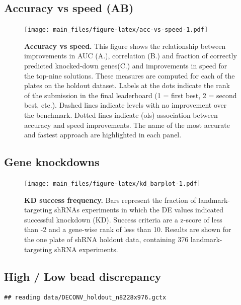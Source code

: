 \documentclass[]{article}
\begin{document}
\hypertarget{accuracy-vs-speed-ab}{%
\subsection{Accuracy vs speed (AB)}\label{accuracy-vs-speed-ab}}

\begin{figure}
\centering
\texttt{[image: main\_files/figure-latex/acc-vs-speed-1.pdf]}
\caption{\label{fig:acc-vs-speed}\textbf{Accuracy vs speed.} This figure
shows the relationship between improvements in AUC (A.), correlation
(B.) and fraction of correctly predicted knocked-down genes(C.) and
improvements in speed for the top-nine solutions. These measures are
computed for each of the plates on the holdout dataset. Labels at the
dots indicate the rank of the submission in the final leaderboard (1 =
first best, 2 = second best, etc.). Dashed lines indicate levels with no
improvement over the benchmark. Dotted lines indicate (ols) association
between accuracy and speed improvements. The name of the most accurate
and fastest approach are highlighted in each panel.}
\end{figure}

\hypertarget{gene-knockdowns}{%
\subsection{Gene knockdowns}\label{gene-knockdowns}}

\begin{figure}
\centering
\texttt{[image: main\_files/figure-latex/kd\_barplot-1.pdf]}
\caption{\label{kd_barplot}\textbf{KD success frequency.} Bars represent
the fraction of landmark-targeting shRNAs experiments in which the DE
values indicated successful knockdown (KD). Success criteria are a
z-score of less than -2 and a gene-wise rank of less than 10. Results
are shown for the one plate of shRNA holdout data, containing 376
landmark-targeting shRNA experiments.}
\end{figure}

\hypertarget{high-low-bead-discrepancy}{%
\subsection{High / Low bead
discrepancy}\label{high-low-bead-discrepancy}}

\begin{verbatim}
## reading data/DECONV_holdout_n8228x976.gctx
\end{verbatim}
\end{document}

